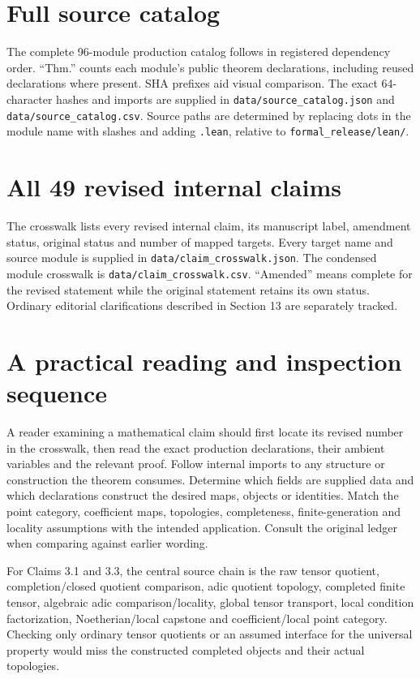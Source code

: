\documentclass[11pt]{article}
\newcommand{\code}[1]{\nolinkurl{#1}}
\begin{document}
\appendix
\section{Full source catalog}
The complete 96-module production catalog follows in registered dependency order. ``Thm.'' counts each module's public theorem declarations, including reused declarations where present. SHA prefixes aid visual comparison. The exact 64-character hashes and imports are supplied in \code{data/source_catalog.json} and \code{data/source_catalog.csv}. Source paths are determined by replacing dots in the module name with slashes and adding \code{.lean}, relative to \code{formal_release/lean/}.
{\small}

\section{All 49 revised internal claims}
The crosswalk lists every revised internal claim, its manuscript label, amendment status, original status and number of mapped targets. Every target name and source module is supplied in \code{data/claim_crosswalk.json}. The condensed module crosswalk is \code{data/claim_crosswalk.csv}. ``Amended'' means complete for the revised statement while the original statement retains its own status. Ordinary editorial clarifications described in Section 13 are separately tracked.
{\small}

\section{A practical reading and inspection sequence}
A reader examining a mathematical claim should first locate its revised number in the crosswalk, then read the exact production declarations, their ambient variables and the relevant proof. Follow internal imports to any structure or construction the theorem consumes. Determine which fields are supplied data and which declarations construct the desired maps, objects or identities. Match the point category, coefficient maps, topologies, completeness, finite-generation and locality assumptions with the intended application. Consult the original ledger when comparing against earlier wording.

For Claims 3.1 and 3.3, the central source chain is the raw tensor quotient, completion/closed quotient comparison, adic quotient topology, completed finite tensor, algebraic adic comparison/locality, global tensor transport, local condition factorization, Noetherian/local capstone and coefficient/local point category. Checking only ordinary tensor quotients or an assumed interface for the universal property would miss the constructed completed objects and their actual topologies.
\end{document}
